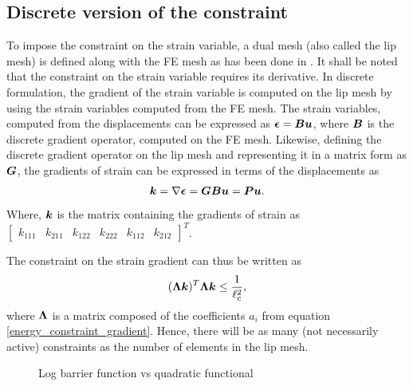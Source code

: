 \documentclass[12pt]{elsarticle}
\begin{document}
\subsection{Discrete version of the constraint}
To impose the constraint on the strain variable, a dual mesh (also called the lip mesh) is defined along with the FE mesh as has been done in \cite{Moes and Chevaugeon}. It shall be noted that the constraint on the strain variable requires its derivative. In discrete formulation, the gradient of the strain variable is computed on the lip mesh by using the strain variables computed from the FE mesh. The strain variables, computed from the displacements can be expressed as $\mbox{\boldmath $\epsilon$} = \mbox{\boldmath $B$} \mbox{\boldmath $u$}$, where $\mbox{\boldmath $B$}$ is the discrete gradient operator, computed on the FE mesh. Likewise, defining the discrete gradient operator on the lip mesh and representing it in a matrix form as $\mbox{\boldmath $G$}$, the gradients of strain can be expressed in terms of the displacements as 
\begin{equation}
	\mbox{\boldmath $k$} = \nabla \mbox{\boldmath $\epsilon$} = \mbox{\boldmath $G$} \mbox{\boldmath $B$} \mbox{\boldmath $u$} = \mbox{\boldmath $P$} \mbox{\boldmath $u$}.
\end{equation}
Where, $\mbox{\boldmath $k$}$ is the matrix containing the gradients of strain as $\begin{bmatrix}
	k_{111} & k_{211} & k_{122} & k_{222} & k_{112} & k_{212}
\end{bmatrix}^T$.

The constraint on the strain gradient can thus be written as 
\begin{equation} \label{discrete_constraint}
	(\mbox{\boldmath $\Lambda$} \mbox{\boldmath $k$} )^T \mbox{\boldmath $\Lambda$} \mbox{\boldmath $k$} \leq \frac{1}{\ell_c^2},
\end{equation}
where $\mbox{\boldmath $\Lambda$}$ is a matrix composed of the coefficients $a_i$ from equation \ref{energy_constraint_gradient}. Hence, there will be as many (not necessarily active) constraints as the number of elements in the lip mesh.

\begin{figure}[ht]
	\centering
	
	\caption{Log barrier function vs quadratic functional}
	\label{comparison_log_quadratic}
\end{figure}
\end{document}
